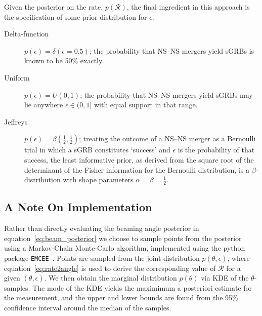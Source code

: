 \documentclass[twocolumn,nofootinbib]{revtex4-1}
\newcommand{\cbcrate}{{{\mathcal R}}}
\newcommand{\BNS}{\ac{NS}--\ac{NS}\xspace}
\newcommand{\ish}[1]{{\color{blue}{#1}}}
\begin{document}
Given the posterior on the rate, $p(\cbcrate)$, the final ingredient in this
approach is the specification of some prior distribution for $\epsilon$.
\ish{Given the lack of information on the value and distribution of $\epsilon$, we choose three plausible priors and study their effects on our beaming angle inference.
     Our choice of priors are:}
%
\begin{description}
\item [Delta-function] $p(\epsilon) = \delta(\epsilon=0.5)$;
        the probability that \BNS mergers yield \acp{sGRB} is known to be 50\%
        exactly.

\item [Uniform] $p(\epsilon)=U(0,1)$;
        the probability that \BNS mergers yield \acp{sGRB} may lie anywhere
    $\epsilon \in (0,1]$ with equal support in that range. 

    \item [Jeffreys] $p(\epsilon)=\beta(\frac{1}{2},\frac{1}{2})$; treating the
        outcome of a \BNS merger as a Bernoulli trial in which a \ac{sGRB}
        constitutes `success' and $\epsilon$ is the probability of that success,
        the least informative prior, as derived from the square root of the
        determinant of the Fisher information for the Bernoulli distribution, is
        a $\beta$-distribution with shape parameters $\alpha=\beta=\frac{1}{2}$.
\end{description}


\subsection{A Note On Implementation}
Rather than directly evaluating the beaming angle posterior in equation~\ref{eq:beam_posterior} we choose to sample points from the posterior using a Markov-Chain Monte-Carlo algorithm, implemented using the python package {\tt EMCEE}~\cite{2013PASP..125..306F}.
Points are sampled from the joint distribution $p(\theta,\epsilon)$, where equation~\ref{eq:rate2angle} is used to derive the corresponding value of $\cbcrate$ for a given $(\theta,\epsilon)$.
We then obtain the marginal distribution $p(\theta)$ via \ac{KDE} of the $\theta$-samples.
The mode of the \ac{KDE} yields the maximimum a posteriori estimate for the measurement, and the upper and lower bounds are found from the 95\% confidence interval around the median of the samples.
\end{document}
